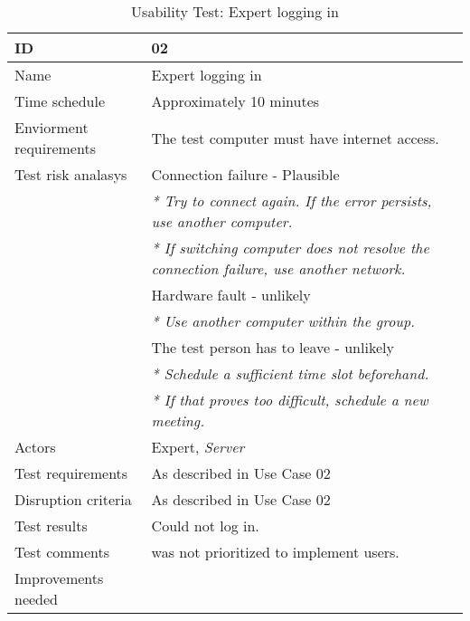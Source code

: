 {\footnotesize
\begin{table}[H]
\begin{tabular}{| p{5cm} | p{10cm} |}\hline
	\textbf{ID}	& \textbf{02} \\ \hline
	Name		& Expert logging in\\ \hline
	Time schedule	& Approximately 10 minutes\\ \hline
	Enviorment requirements 
		& The test computer must have internet access. \\ \hline
	Test risk analasys 
		& Connection failure - Plausible \\
		& \emph{* Try to connect again. If the error persists, use another computer.} \\
		& \emph{* If switching computer does not resolve the connection failure, use another network.}\\
		& Hardware fault - unlikely \\
		& \emph{* Use another computer within the group.} \\
		& The test person has to leave - unlikely \\
		& \emph{* Schedule a sufficient time slot beforehand.} \\
		& \emph{* If that proves too difficult, schedule a new meeting.}\\ \hline
	Actors	& Expert, \emph{Server}\\ \hline
	Test requirements & As described in Use Case 02 \\ \hline
	Disruption criteria & As described in Use Case 02  \\ \hline
	Test results & Could not log in.
		& \\ \hline
	Test comments & was not prioritized to implement users.
		& \\ \hline
	Improvements needed
		& \\ \hline
\end{tabular}


\caption{Usability Test: Expert logging in}
\label{fig:usability_test_2}
\end{table}}



